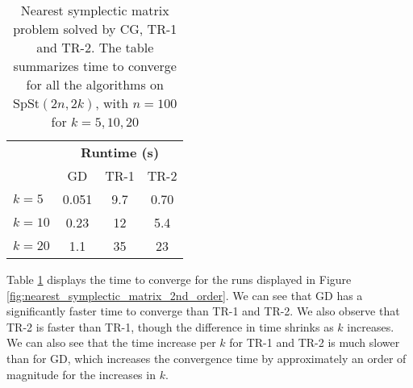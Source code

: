 \begin{table}
    \centering
    \caption[Nearest symplectic matrix problem solved by CG, TR-1 and TR-2 timetable]{Nearest symplectic matrix problem solved by CG, TR-1 and TR-2. The table summarizes time to converge for all the algorithms on $\mathrm{SpSt}(2n, 2k)$, with $n=100$ for $k={5,10,20}$}\label{tab:exp1}
    \begin{tabular}{ l c c c }\label{tbl:Nearest_symplectic_matrix_2nd_order}
        & \multicolumn{3}{c}{\textbf{Runtime (s)}} \\ 
        \cmidrule(l){2-4}
        & GD & TR-1 & TR-2 \\
        \midrule
        $k=5$ & 0.051 & 9.7 & 0.70 \\
        $k=10$ & 0.23 & 12 & 5.4 \\
        $k=20$ & 1.1 & 35 & 23 \\        
    \end{tabular}
\end{table}
Table \ref{tbl:Nearest_symplectic_matrix_2nd_order} displays the time to converge for the runs displayed in Figure \ref{fig:nearest_symplectic_matrix_2nd_order}. We can see that GD has a significantly faster time to converge than TR-1 and TR-2. We also observe that TR-2 is faster than TR-1, though the difference in time shrinks as $k$ increases. We can also see that the time increase per $k$ for TR-1 and TR-2 is much slower than for GD, which increases the convergence time by approximately an order of magnitude for the increases in $k$. 







        
